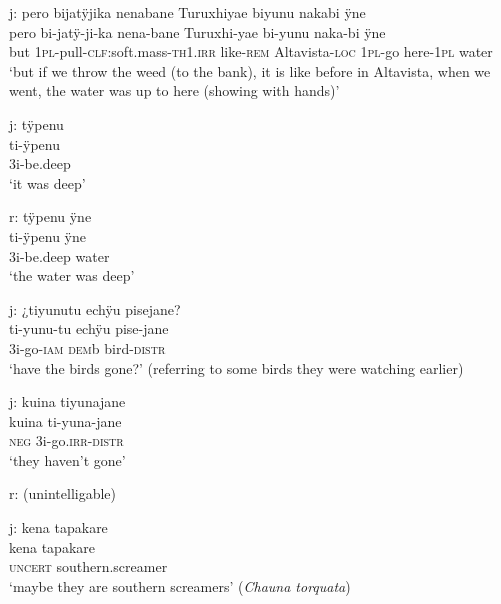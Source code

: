 \ea%
\begingl 
\glpreamble \textup{j:} pero bijatÿjika nenabane Turuxhiyae biyunu nakabi ÿne\\
\gla pero bi-jatÿ-ji-ka nena-bane Turuxhi-yae bi-yunu naka-bi ÿne\\ 
\glb but 1\textsc{pl}-pull-\textsc{clf:}soft.mass-\textsc{th}1\textsc{.irr} like-\textsc{rem} Altavista-\textsc{loc} 1\textsc{pl}-go here-1\textsc{pl} water\\ 
\glft ‘but if we throw the weed (to the bank), it is like before in Altavista, when we went, the water was up to here (showing with hands)’\\ 
\endgl
\xe

\ea%
\begingl 
\glpreamble \textup{j:} tÿpenu\\
\gla ti-ÿpenu\\ 
\glb 3i-be.deep\\ 
\glft ‘it was deep’\\ 
\endgl
\xe

\ea%
\begingl 
\glpreamble \textup{r:} tÿpenu ÿne\\
\gla ti-ÿpenu ÿne\\ 
\glb 3i-be.deep water\\ 
\glft ‘the water was deep’\\ 
\endgl
\xe

\ea%
\begingl 
\glpreamble \textup{j:} ¿tiyunutu echÿu pisejane?\\
\gla ti-yunu-tu echÿu pise-jane\\ 
\glb 3i-go-\textsc{iam} \textsc{dem}b bird-\textsc{distr}\\ 
\glft ‘have the birds gone?’ (referring to some birds they were watching earlier)\\ 
\endgl
\xe

\ea%
\begingl 
\glpreamble \textup{j:}  kuina tiyunajane\\
\gla  kuina ti-yuna-jane\\ 
\glb \textsc{neg} 3i-go.\textsc{irr}-\textsc{distr}\\ 
\glft ‘they haven’t gone’\\ 
\endgl
\xe

\ea%
 \textup{r:} (unintelligable)
\xe


\ea%
\begingl 
\glpreamble \textup{j:} kena tapakare\\
\gla kena tapakare\\ 
\glb \textsc{uncert} southern.screamer\\ 
\glft ‘maybe they are southern screamers’ (\textit{Chauna torquata})\\ 
\endgl
\xe

